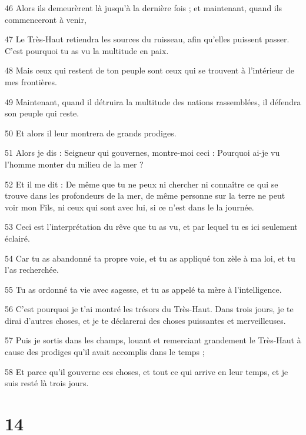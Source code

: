 \par 46 Alors ils demeurèrent là jusqu'à la dernière fois ; et maintenant, quand ils commenceront à venir,
\par 47 Le Très-Haut retiendra les sources du ruisseau, afin qu'elles puissent passer. C'est pourquoi tu as vu la multitude en paix.
\par 48 Mais ceux qui restent de ton peuple sont ceux qui se trouvent à l'intérieur de mes frontières.
\par 49 Maintenant, quand il détruira la multitude des nations rassemblées, il défendra son peuple qui reste.
\par 50 Et alors il leur montrera de grands prodiges.
\par 51 Alors je dis : Seigneur qui gouvernes, montre-moi ceci : Pourquoi ai-je vu l'homme monter du milieu de la mer ?
\par 52 Et il me dit : De même que tu ne peux ni chercher ni connaître ce qui se trouve dans les profondeurs de la mer, de même personne sur la terre ne peut voir mon Fils, ni ceux qui sont avec lui, si ce n'est dans le la journée.
\par 53 Ceci est l'interprétation du rêve que tu as vu, et par lequel tu es ici seulement éclairé.
\par 54 Car tu as abandonné ta propre voie, et tu as appliqué ton zèle à ma loi, et tu l'as recherchée.
\par 55 Tu as ordonné ta vie avec sagesse, et tu as appelé ta mère à l'intelligence.
\par 56 C'est pourquoi je t'ai montré les trésors du Très-Haut. Dans trois jours, je te dirai d'autres choses, et je te déclarerai des choses puissantes et merveilleuses.
\par 57 Puis je sortis dans les champs, louant et remerciant grandement le Très-Haut à cause des prodiges qu'il avait accomplis dans le temps ;
\par 58 Et parce qu'il gouverne ces choses, et tout ce qui arrive en leur temps, et je suis resté là trois jours.

\chapter{14}

